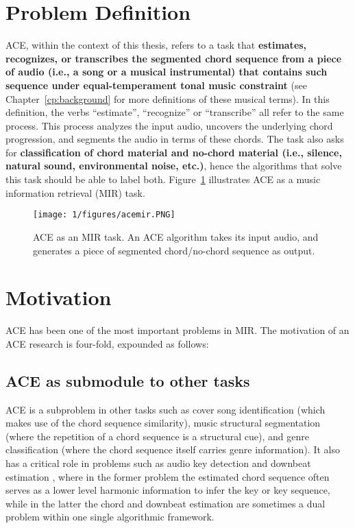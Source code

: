 \section{Problem Definition} \label{sec:1-problemdef}
ACE, within the context of this thesis, refers to a task that \textbf{estimates, recognizes, or transcribes the segmented chord sequence from a piece of audio (i.e., a song or a musical instrumental) that contains such sequence under equal-temperament tonal music constraint} (see Chapter~\ref{cp:background} for more definitions of these musical terms). In this definition, the verbs ``estimate'', ``recognize'' or ``transcribe'' all refer to the same process. This process analyzes the input audio, uncovers the underlying chord progression, and segments the audio in terms of these chords. The task also asks for \textbf{classification of chord material and no-chord material (i.e., silence, natural sound, environmental noise, etc.)}, hence the algorithms that solve this task should be able to label both. Figure~\ref{fig:1-acemir} illustrates ACE as a music information retrieval (MIR) task.
\begin{figure}[h]
\centering
\texttt{[image: 1/figures/acemir.PNG]}
\caption{ACE as an MIR task. An ACE algorithm takes its input audio, and generates a piece of segmented chord/no-chord sequence as output.}
\label{fig:1-acemir}
\end{figure}

\section{Motivation} \label{sec:1-moti}
ACE has been one of the most important problems in MIR. The motivation of an ACE research is four-fold, expounded as follows:

\subsection{ACE as submodule to other tasks}
ACE is a subproblem in other tasks such as cover song identification \cite{bello2007audio,lee2006identifying,serra2010audio} (which makes use of the chord sequence similarity), music structural segmentation \cite{bello2005robust} (where the repetition of a chord sequence is a structural cue), and genre classification \cite{cheng2008automatic,perez2009genre} (where the chord sequence itself carries genre information). It also has a critical role in problems such as audio key detection \cite{papadopoulos2012modeling,pauwels2010integrating} and downbeat estimation \cite{papadopoulos2008simultaneous,mauch2010simultaneous}, where in the former problem the estimated chord sequence often serves as a lower level harmonic information to infer the key or key sequence, while in the latter the chord and downbeat estimation are sometimes a dual problem within one single algorithmic framework.

